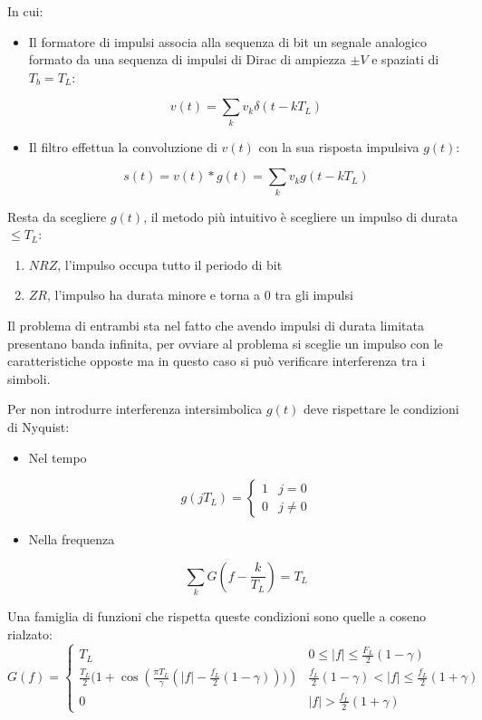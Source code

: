 \documentclass{article}
\begin{document}
\noindent In cui:
\begin{itemize}
    \item Il formatore di impulsi associa alla sequenza di bit un segnale analogico formato da una sequenza di impulsi di Dirac di ampiezza $\pm V$ e spaziati di $T_b=T_L$:

        $$v(t)=\sum_kv_k\delta(t-kT_L)$$

    \item Il filtro effettua la convoluzione di $v(t)$ con la sua risposta impulsiva $g(t)$:

    $$s(t)=v(t)*g(t)=\sum_kv_kg(t-kT_L)$$\newline
    
\end{itemize}

\noindent Resta da scegliere $g(t)$, il metodo più intuitivo è scegliere un impulso di durata $\leq T_L$:
\begin{enumerate}
    \item $NRZ$, l'impulso occupa tutto il periodo di bit
    \item $ZR$, l'impulso ha durata minore e torna a 0 tra gli impulsi\newline
\end{enumerate}

\noindent Il problema di entrambi sta nel fatto che avendo impulsi di durata limitata presentano banda infinita, per ovviare al problema si sceglie un impulso con le caratteristiche opposte ma in questo caso si può verificare interferenza tra i simboli.\newline

\noindent Per non introdurre interferenza intersimbolica $g(t)$ deve rispettare le condizioni di Nyquist:
\begin{itemize}
    \item Nel tempo

        \[g(jT_L)=\begin{cases}
            1 & j=0\\
            0 & j\neq 0
        \end{cases}\]

    \item Nella frequenza

        $$\sum_kG(f-\frac{k}{T_L})=T_L$$\newline
    
\end{itemize}

\noindent Una famiglia di funzioni che rispetta queste condizioni sono quelle a coseno rialzato:
\[G(f)=\begin{cases}
    T_L & 0\leq|f|\leq\frac{F_L}{2}(1-\gamma)\\
    \frac{T_L}{2}(1+\cos({\frac{\pi T_L}{\gamma}(|f|-\frac{f_L}{2}(1-\gamma)))}) & \frac{f_L}{2}(1-\gamma)<|f|\leq\frac{f_L}{2}(1+\gamma)\\
    0 & |f|>\frac{f_L}{2}(1+\gamma)
\end{cases}\]
\end{document}

